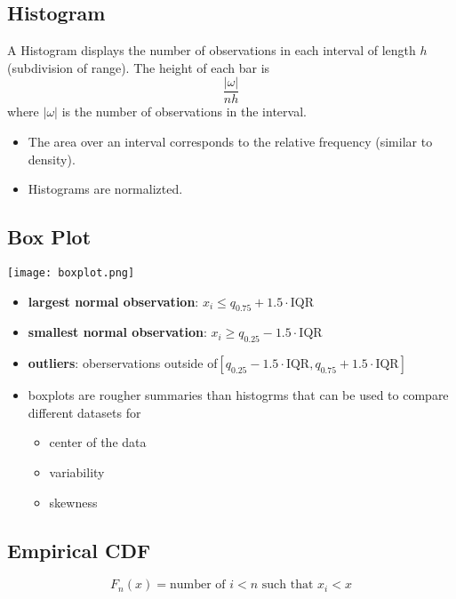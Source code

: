 \subsection{Histogram}
A Histogram displays the number of observations in each interval of length $h$ (subdivision of range).
The height of each bar is
\noindent\begin{equation*}
    \frac{|\omega|}{nh}
\end{equation*}
where $|\omega|$ is the number of observations in the interval.
\begin{itemize}
    \item The area over an interval corresponds to the relative frequency (similar to density).
    \item Histograms are normalizted.
\end{itemize}

\subsection{Box Plot}
\begin{center}
    \texttt{[image: boxplot.png]}
\end{center}
\begin{itemize}
    \item \textbf{largest normal observation}: $x_i\leq q_{0.75}+1.5\cdot$IQR
    \item \textbf{smallest normal observation}: $x_i\geq q_{0.25}-1.5\cdot$IQR
    \item \textbf{outliers}: oberservations outside of\newline $[q_{0.25}-1.5\cdot\text{IQR},q_{0.75}+1.5\cdot\text{IQR}]$
    \item boxplots are rougher summaries than histogrms that can be used to compare different datasets for
          \begin{itemize}
              \item center of the data
              \item variability
              \item skewness
          \end{itemize}
\end{itemize}

\subsection{Empirical CDF}
\noindent\begin{equation*}
    F_n(x)= \text{number of } i<n \text{ such that } x_i<x
\end{equation*}

